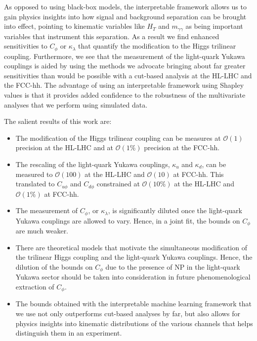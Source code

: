 
As opposed to using black-box models, the interpretable framework allows us to gain physics insights into how signal and background separation can be brought into effect, pointing to kinematic variables like $H_T$ and $m_{\gamma\gamma}$ as being important variables that instrument this separation. As a result we find enhanced sensitivities to $C_\phi$ or $\kappa_\lambda$ that quantify the modification to the Higgs trilinear coupling. Furthermore, we see that the measurement of the light-quark Yukawa couplings is aided by using the methods we advocate bringing about far greater sensitivities than would be possible with a cut-based analysis at the HL-LHC and the FCC-hh. The advantage of using an interpretable framework using Shapley values is that it provides added confidence to the robustness of the multivariate analyses that we perform using simulated data.

The salient results of this work are:
\begin{itemize}
	\itemsep0em
	\item The modification of the Higgs trilinear coupling can be measures at $\mathcal{O}(1)$ precision at the HL-LHC and at $\mathcal{O}(1\%)$ precision at the FCC-hh. 
	\item The rescaling of the light-quark Yukawa couplings, $\kappa_u$ and $\kappa_d$, can be measured to $\mathcal{O}(100)$ at the HL-LHC and $\mathcal{O}(10)$ at FCC-hh. This translated to $C_{u\phi}$ and $C_{d\phi}$ constrained at $\mathcal{O}(10\%)$ at the HL-LHC and $\mathcal{O}(1\%)$ at FCC-hh.
	\item The measurement of $C_\phi$, or $\kappa_\lambda$, is significantly diluted once the light-quark Yukawa couplings are allowed to vary. Hence, in a joint fit, the bounds on $C_\phi$ are much weaker. 
	\item There are theoretical models that motivate the simultaneous modification of the trilinear Higgs coupling and the light-quark Yukawa couplings. Hence, the dilution of the bounds on $C_\phi$ due to the presence of NP in the light-quark Yukawa sector should be taken into consideration in future phenomenological extraction of $C_\phi$.
	\item The bounds obtained with the interpretable machine learning framework that we use not only outperforms cut-based analyses by far, but also allows for physics insights into kinematic distributions of the various channels that helps distinguish them in an experiment.
\end{itemize}


